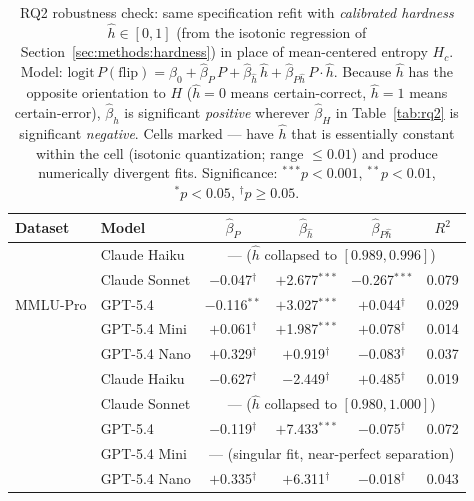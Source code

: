\begin{table}[t]
\centering
\caption{RQ2 robustness check: same specification refit with \emph{calibrated hardness} $\hat h \in [0, 1]$ (from the isotonic regression of Section~\ref{sec:methods:hardness}) in place of mean-centered entropy $H_c$. Model: $\mathrm{logit}\,P(\mathrm{flip}) = \beta_0 + \hat\beta_P\,P + \hat\beta_{\hat h}\,\hat h + \hat\beta_{P\hat h}\,P\!\cdot\!\hat h$. Because $\hat h$ has the opposite orientation to $H$ ($\hat h{=}0$ means certain-correct, $\hat h{=}1$ means certain-error), $\hat\beta_{\hat h}$ is significant \emph{positive} wherever $\hat\beta_H$ in Table~\ref{tab:rq2} is significant
  \emph{negative}. Cells marked --- have $\hat h$ that is essentially
  constant within the cell (isotonic quantization; range $\leq 0.01$)
  and produce numerically divergent fits.
  Significance: $^{***}p{<}0.001$, $^{**}p{<}0.01$, $^{*}p{<}0.05$,
  $^\dagger p{\geq}0.05$.}
\label{tab:rq2_hardness}
\small\setlength{\tabcolsep}{3pt}
\begin{tabular}{ll cccc}
\toprule
\textbf{Dataset} & \textbf{Model} & $\hat\beta_P$ & $\hat\beta_{\hat h}$ & $\hat\beta_{P\hat h}$ & $R^2$ \\
\midrule
\multirow{5}{*}{MMLU-Pro}
  & Claude Haiku  & \multicolumn{4}{c}{--- \tiny{($\hat h$ collapsed to $[0.989, 0.996]$)}} \\
  & Claude Sonnet & $-$0.047$^\dagger$  & $+$2.677$^{***}$ & $-$0.267$^{***}$    & 0.079 \\
  & GPT-5.4       & $-$0.116$^{**}$     & $+$3.027$^{***}$ & $+$0.044$^\dagger$  & 0.029 \\
  & GPT-5.4 Mini  & $+$0.061$^\dagger$  & $+$1.987$^{***}$ & $+$0.078$^\dagger$  & 0.014 \\
  & GPT-5.4 Nano  & $+$0.329$^\dagger$  & $+$0.919$^\dagger$ & $-$0.083$^\dagger$ & 0.037 \\
\addlinespace
\multirow{5}{*}{GPQA-Diam.}
  & Claude Haiku  & $-$0.627$^\dagger$  & $-$2.449$^\dagger$ & $+$0.485$^\dagger$  & 0.019 \\
  & Claude Sonnet & \multicolumn{4}{c}{--- \tiny{($\hat h$ collapsed to $[0.980, 1.000]$)}} \\
  & GPT-5.4       & $-$0.119$^\dagger$  & $+$7.433$^{***}$ & $-$0.075$^\dagger$  & 0.072 \\
  & GPT-5.4 Mini  & \multicolumn{4}{c}{--- \tiny{(singular fit, near-perfect separation)}} \\
  & GPT-5.4 Nano  & $+$0.335$^\dagger$  & $+$6.311$^\dagger$ & $-$0.018$^\dagger$  & 0.043 \\
\bottomrule
\end{tabular}
\end{table}
